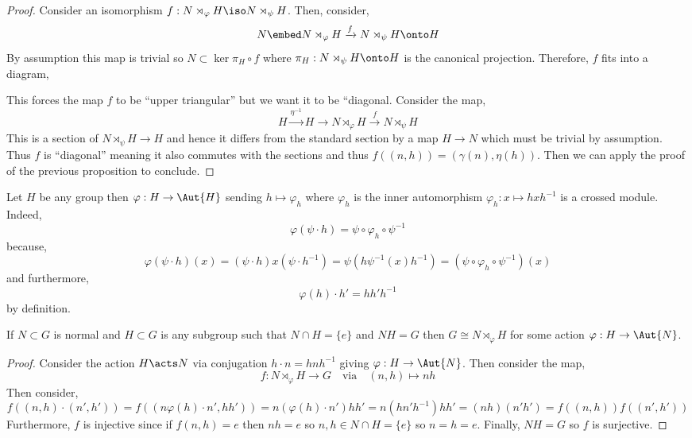 \documentclass[12pt]{article}
\begin{document}
\begin{proof}
Consider an isomorphism $f : N \rtimes_\varphi H \iso N \rtimes_\psi H$. Then, consider,
\[ N \embed N \rtimes_{\varphi} H \xrightarrow{f} N \rtimes_{\psi} H \onto H \]
By assumption this map is trivial so $N \subset \ker{\pi_H \circ f}$ where $\pi_H : N \rtimes_\psi H \onto H$ is the canonical projection. Therefore, $f$ fits into a diagram,
\begin{center}
\end{center}
This forces the map $f$ to be ``upper triangular'' but we want it to be ``diagonal. Consider the map,
\[ H \xrightarrow{\eta^{-1}} H \to N \rtimes_{\varphi} H \xrightarrow{f} N \rtimes_\psi H \]
This is a section of $N \rtimes_\psi H \to H$ and hence it differs from the standard section by a map $H \to N$ which must be trivial by assumption. Thus $f$ is ``diagonal'' meaning it also commutes with the sections and thus $f((n, h)) = (\gamma(n), \eta(h))$. Then we can apply the proof of the previous proposition to conclude.
\end{proof}

\begin{rmk}
Let $H$ be any group then $\varphi : H \to \Aut{H}$ sending $h \mapsto \varphi_h$ where $\varphi_h$ is the inner automorphism $\varphi_h : x \mapsto h x h^{-1}$ is a crossed module. Indeed,
\[ \varphi(\psi \cdot h) = \psi \circ \varphi_h \circ \psi^{-1} \]
because,
\[ \varphi(\psi \cdot h)(x) = (\psi \cdot h) x (\psi \cdot h^{-1}) = \psi(h \psi^{-1}(x) h^{-1}) = (\psi \circ \varphi_h \circ \psi^{-1})(x) \]
and furthermore,
\[ \varphi(h) \cdot h' = h h' h^{-1} \]
by definition.
\end{rmk}

\begin{prop}
If $N \subset G$ is normal and $H \subset G$ is any subgroup such that $N \cap H = \{ e \}$ and $NH = G$ then $G \cong N \rtimes_\varphi H$ for some action $\varphi : H \to \Aut{N}$.
\end{prop}

\begin{proof}
Consider the action $H \acts N$ via conjugation $h \cdot n = h n h^{-1}$ giving $\varphi : H \to \Aut{N}$. Then consider the map,
\[ f : N \rtimes_\varphi H \to G \quad \text{via} \quad (n, h) \mapsto n h \]
Then consider,
\[ f((n, h) \cdot (n', h')) = f((n \varphi(h) \cdot n', h h')) = n (\varphi(h) \cdot n') h h' = n (h n' h^{-1}) h h' = (n h) (n' h') = f((n,h)) f((n', h')) \]
Furthermore, $f$ is injective since if $f(n,h) = e$ then $nh = e$ so $n, h \in N \cap H = \{ e \}$ so $n = h = e$. Finally, $NH = G$ so $f$ is surjective. 
\end{proof}
\end{document}
